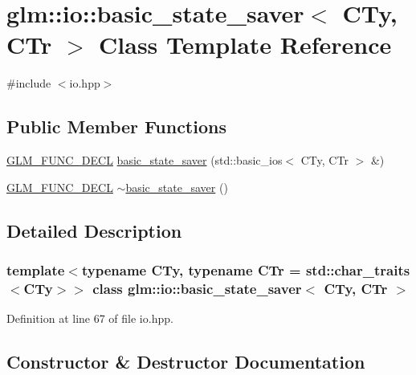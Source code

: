 \hypertarget{classglm_1_1io_1_1basic__state__saver}{}\section{glm\+::io\+::basic\+\_\+state\+\_\+saver$<$ C\+Ty, C\+Tr $>$ Class Template Reference}
\label{classglm_1_1io_1_1basic__state__saver}


{\ttfamily \#include $<$io.\+hpp$>$}

\subsection*{Public Member Functions}
\begin{DoxyCompactItemize}
\item 
\mbox{\hyperlink{setup_8hpp_ab2d052de21a70539923e9bcbf6e83a51}{G\+L\+M\+\_\+\+F\+U\+N\+C\+\_\+\+D\+E\+CL}} \mbox{\hyperlink{classglm_1_1io_1_1basic__state__saver_ab31652b0b7f2a24fa8f9fda2505de356}{basic\+\_\+state\+\_\+saver}} (std\+::basic\+\_\+ios$<$ C\+Ty, C\+Tr $>$ \&)
\item 
\mbox{\hyperlink{setup_8hpp_ab2d052de21a70539923e9bcbf6e83a51}{G\+L\+M\+\_\+\+F\+U\+N\+C\+\_\+\+D\+E\+CL}} \mbox{\hyperlink{classglm_1_1io_1_1basic__state__saver_ad89569bbaec5d7fe08d40dbac5abbb53}{$\sim$basic\+\_\+state\+\_\+saver}} ()
\end{DoxyCompactItemize}


\subsection{Detailed Description}
\subsubsection*{template$<$typename C\+Ty, typename C\+Tr = std\+::char\+\_\+traits$<$\+C\+Ty$>$$>$\newline
class glm\+::io\+::basic\+\_\+state\+\_\+saver$<$ C\+Ty, C\+Tr $>$}



Definition at line 67 of file io.\+hpp.



\subsection{Constructor \& Destructor Documentation}
\mbox{\label{classglm_1_1io_1_1basic__state__saver_ab31652b0b7f2a24fa8f9fda2505de356}} 
